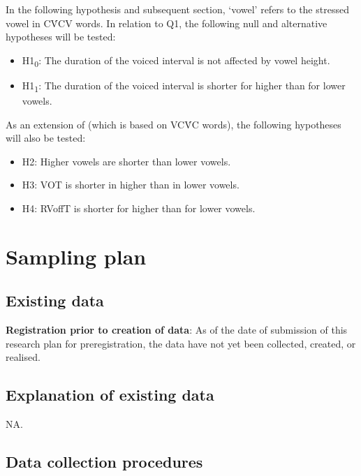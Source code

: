 \documentclass[11pt,]{article}
\providecommand{\tightlist}{%
  \setlength{\itemsep}{0pt}\setlength{\parskip}{0pt}}
\begin{document}
In the following hypothesis and subsequent section, `vowel' refers to
the stressed vowel in CV́CV words. In relation to Q1, the following null
and alternative hypotheses will be tested:

\begin{itemize}
\tightlist
\item
  H1\textsubscript{0}: The duration of the voiced interval is not
  affected by vowel height.
\item
  H1\textsubscript{1}: The duration of the voiced interval is shorter
  for higher than for lower vowels.
\end{itemize}

As an extension of \citet{esposito2002} (which is based on VCV́C words),
the following hypotheses will also be tested:

\begin{itemize}
\tightlist
\item
  H2: Higher vowels are shorter than lower vowels.
\item
  H3: VOT is shorter in higher than in lower vowels.
\item
  H4: RVoffT is shorter for higher than for lower vowels.
\end{itemize}

\hypertarget{sampling-plan}{%
\section{Sampling plan}\label{sampling-plan}}

\hypertarget{existing-data}{%
\subsection{Existing data}\label{existing-data}}

\textbf{Registration prior to creation of data}: As of the date of
submission of this research plan for preregistration, the data have not
yet been collected, created, or realised.

\hypertarget{explanation-of-existing-data}{%
\subsection{Explanation of existing
data}\label{explanation-of-existing-data}}

NA.

\hypertarget{data-collection-procedures}{%
\subsection{Data collection
procedures}\label{data-collection-procedures}}
\end{document}
